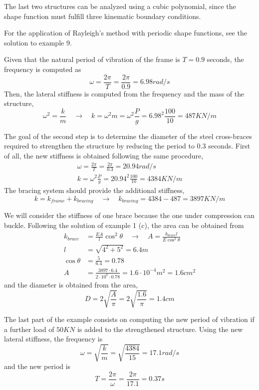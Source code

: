 \documentclass{problems}
\begin{document}
The last two structures can be analyzed using a cubic polynomial, since the shape function must fulfill three kinematic boundary conditions.

For the application of Rayleigh's method with periodic shape functions, see the solution to example 9.



Given that the natural period of vibration of the frame is $T=0.9$ seconds, the frequency is computed as
$$
\omega = \frac{2\pi}{T} = \frac{2\pi}{0.9} = 6.98rad/s
$$
Then, the lateral stiffness is computed from the frequency and the mass of the structure,
$$
\omega^2 = \frac{k}{m} \quad \rightarrow \quad
k = \omega^2m = \omega^2\frac{P}{g} = 6.98^2\frac{100}{10} = 487KN/m
$$

The goal of the second step is to determine the diameter of the steel cross-braces required to strengthen the structure by reducing the period to 0.3 seconds. First of all, the new stiffness is obtained following the same procedure,
\begin{align*}
\omega = \frac{2\pi}{T} = \frac{2\pi}{0.3} = 20.94rad/s \\
k = \omega^2\frac{P}{g} = 20.94^2\frac{100}{10} = 4384KN/m
\end{align*}
The bracing system should provide the additional stiffness,
$$
k = k_{frame} + k_{bracing} \quad \rightarrow \quad k_{bracing} = 4384 - 487 = 3897KN/m
$$

We will consider the stiffness of one brace because the one under compression can buckle. 
Following the solution of example 1 (c), the area can be obtained from
\begin{align*}
k_{brace} &= \frac{EA}{l}\cos^2\theta \quad \rightarrow \quad A = \frac{k_{brace}l}{E\cos^2\theta} \\
l &= \sqrt{4^2 + 5^2} = 6.4m \\
\cos\theta &= \frac{5}{6.4} = 0.78 \\
A &= \frac{3897\cdot 6.4}{2\cdot 10^8\cdot 0.78} = 1.6\cdot 10^{-4} m^2 = 1.6cm^2
\end{align*}
and the diameter is obtained from the area,
$$
D = 2\sqrt{\frac{A}{\pi}} = 2\sqrt{\frac{1.6}{\pi}} = 1.4cm
$$

The last part of the example consists on computing the new period of vibration if a further load of $50KN$ is added to the strengthened structure. Using the new lateral stiffness, the frequency is
$$
\omega = \sqrt{\frac{k}{m}} = \sqrt{\frac{4384}{15}} = 17.1 rad/s
$$
and the new period is
$$
T = \frac{2\pi}{\omega} = \frac{2\pi}{17.1} = 0.37s
$$
\end{document}
